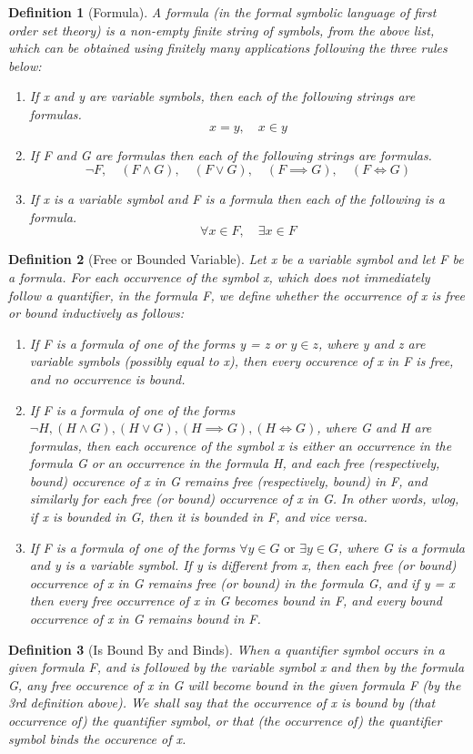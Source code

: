 \documentclass[11pt, oneside]{book}
\theoremstyle{break}
\newtheorem{defn}{Definition}[section]
\begin{document}
\begin{defn}[Formula]
	A formula (in the formal symbolic language of first order set theory) is a non-empty finite string of symbols, from the above list, which can be obtained using finitely many applications following the three rules below:
	\begin{enumerate}
		\item If x and y are variable symbols, then each of the following strings are formulas.
		\[
			x = y, \quad x \in y
		\]
		\item If F and G are formulas then each of the following strings are formulas.
		\[
			\neg F, \quad (F \land G), \quad (F \lor G), \quad (F \implies G), \quad (F \iff G)
		\]
		\item If x is a variable symbol and F is a formula then each of the following is a formula.
		\[
			\forall x \in F, \quad \exists x \in F
		\]
	\end{enumerate}
\end{defn}

\begin{defn}[Free or Bounded Variable]
	Let x be a variable symbol and let F be a formula. For each occurrence of the symbol x, which does not immediately follow a quantifier, in the formula F, we define whether the occurrence of x is free or bound inductively as follows:
	\begin{enumerate}
		\item If F is a formula of one of the forms y = z or $y \in z$, where y and z are variable symbols (possibly equal to x), then every occurence of x in F is free, and no occurrence is bound.

		\item If F is a formula of one of the forms $\neg H, (H \land G), (H \lor G), (H \implies G), (H \iff G)$, where G and H are formulas, then each occurence of the symbol x is either an occurrence in the formula G or an occurrence in the formula H, and each free (respectively, bound) occurence of x in G remains free (respectively, bound) in F, and similarly for each free (or bound) occurrence of x in G. In other words, wlog, if x is bounded in G, then it is bounded in F, and vice versa.
		\item If F is a formula of one of the forms $\forall y \in G \text{ or } \exists y \in G$, where G is a formula and y is a variable symbol. If y is different from x, then each free (or bound) occurrence of x in G remains free (or bound) in the formula G, and if y = x then every free occurrence of x in G becomes bound in F, and every bound occurrence of x in G remains bound in F.
	\end{enumerate}
\end{defn}

\begin{defn}[Is Bound By and Binds]
	When a quantifier symbol occurs in a given formula F, and is followed by the variable symbol x and then by the formula G, any free occurence of x in G will become bound in the given formula F (by the 3rd definition above). We shall say that the occurrence of x is bound by (that occurrence of) the quantifier symbol, or that (the occurrence of) the quantifier symbol binds the occurence of x.
\end{defn}
\end{document}
